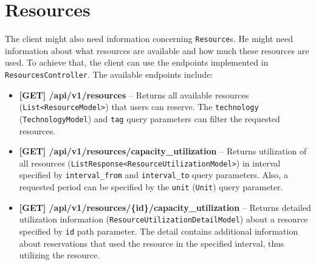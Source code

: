 \section{Resources}
The client might also need information concerning \texttt{Resource}s. He might need information about what resources are available and how much these resources are used.
To achieve that, the client can use the endpoints implemented in \texttt{ResourcesController}.
The available endpoints include:
\begin{itemize}
    \item \textbf{[GET] /api/v1/resources} -- Returns all available resources (\texttt{List\-<ResourceModel>}) that users can reserve. The \texttt{technology} (\texttt{TechnologyModel}) and \texttt{tag} query parameters can filter the requested resources.
    \item \textbf{[GET] /api/v1/resources/capacity\_utilization} -- Returns utilization of all resources (\texttt{ListResponse<ResourceUtilizationModel>}) in interval specified by \texttt{interval\_from} and \texttt{interval\_to} query parameters. Also, a requested period can be specified by the \texttt{unit} (\texttt{Unit}) query parameter.
    \item \textbf{[GET] /api/v1/resources/\{id\}/capacity\_utilization} -- Returns detailed utilization information (\texttt{ResourceUtilizationDetailModel}) about a resource specified by \texttt{id} path parameter. The detail contains additional information about reservations that used the resource in the specified interval, thus utilizing the resource.
\end{itemize}
